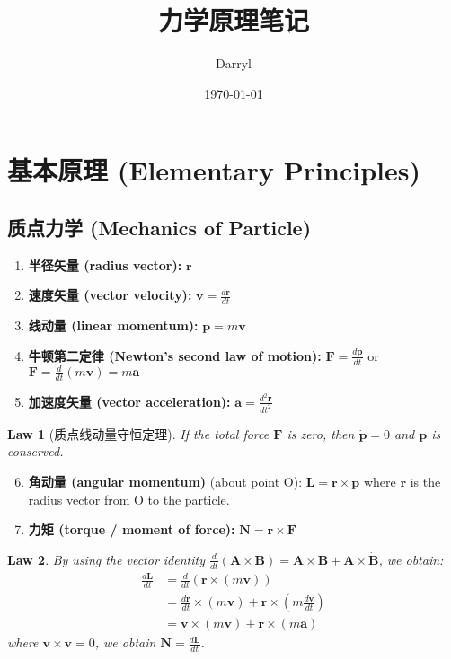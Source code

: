 \documentclass[12pt,a4paper]{article}
\title{力学原理笔记}
\author{Darryl}
\date{\today}
\newtheorem{law}{Law}[section]
\theoremstyle{definition}
\theoremstyle{remark}
\renewcommand{\vec}[1]{\mathbf{#1}}
\begin{document}
	
	\maketitle
	
	\section{基本原理 (Elementary Principles)}
	
	\subsection{质点力学 (Mechanics of Particle)}
	
	\begin{enumerate}
		\item \textbf{半径矢量 (radius vector):} $\vec{r}$
		\item \textbf{速度矢量 (vector velocity):} $\vec{v} = \frac{d\vec{r}}{dt}$
		\item \textbf{线动量 (linear momentum):} $\vec{p} = m\vec{v}$
		\item \textbf{牛顿第二定律 (Newton's second law of motion):} $\vec{F} = \frac{d\vec{p}}{dt}$ or $\vec{F} = \frac{d}{dt}(m\vec{v}) = m\vec{a}$
		\item \textbf{加速度矢量 (vector acceleration):} $\vec{a} = \frac{d^2\vec{r}}{dt^2}$
	\end{enumerate}
	
	\begin{law}[质点线动量守恒定理]
		If the total force $\vec{F}$ is zero, then $\dot{\vec{p}} = 0$ and $\vec{p}$ is conserved.
	\end{law}
	
	\begin{enumerate}
		\setcounter{enumi}{5}
		\item \textbf{角动量 (angular momentum)} (about point O): $\vec{L} = \vec{r} \times \vec{p}$ where $\vec{r}$ is the radius vector from O to the particle.
		\item \textbf{力矩 (torque / moment of force):} $\vec{N} = \vec{r} \times \vec{F}$
	\end{enumerate}
	
	\begin{law}
		By using the vector identity $\frac{d}{dt}(\vec{A} \times \vec{B}) = \dot{\vec{A}} \times \vec{B} + \vec{A} \times \dot{\vec{B}}$, we obtain:
		\begin{align*}
			\frac{d\vec{L}}{dt} &= \frac{d}{dt}(\vec{r} \times (m\vec{v})) \\
			&= \frac{d\vec{r}}{dt} \times (m\vec{v}) + \vec{r} \times (m\frac{d\vec{v}}{dt}) \\
			&= \vec{v} \times (m\vec{v}) + \vec{r} \times (m\vec{a})
		\end{align*}
		where $\vec{v} \times \vec{v} = 0$, we obtain $\vec{N} = \frac{d\vec{L}}{dt}$.
	\end{law}
	
\end{document}
